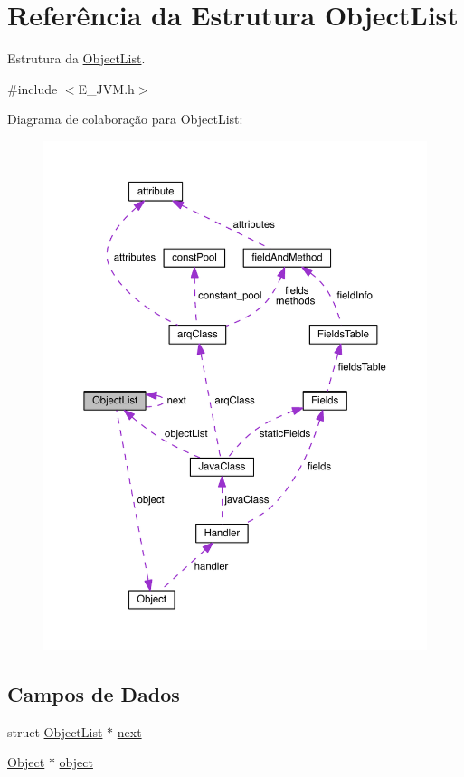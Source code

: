 \hypertarget{struct_object_list}{}\section{Referência da Estrutura Object\+List}
\label{struct_object_list}


Estrutura da \hyperlink{struct_object_list}{Object\+List}.  




{\ttfamily \#include $<$E\+\_\+\+J\+V\+M.\+h$>$}



Diagrama de colaboração para Object\+List\+:
\nopagebreak
\begin{figure}[H]
\begin{center}
\leavevmode
\includegraphics[width=350pt]{struct_object_list__coll__graph}
\end{center}
\end{figure}
\subsection*{Campos de Dados}
\begin{DoxyCompactItemize}
\item 
struct \hyperlink{struct_object_list}{Object\+List} $\ast$ \hyperlink{struct_object_list_a2e433d18d52a5cd2b3f90651157fdb23}{next}
\item 
\hyperlink{struct_object}{Object} $\ast$ \hyperlink{struct_object_list_aae49442726f57917e2d6611c62f1e071}{object}
\end{DoxyCompactItemize}


